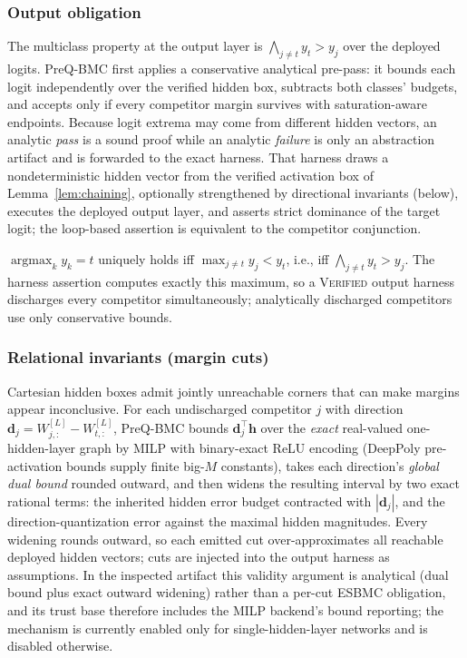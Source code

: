 \subsubsection{Output obligation}
The multiclass property at the output layer is
$\bigwedge_{j\ne t} y_t > y_j$ over the deployed logits. PreQ-BMC first
applies a conservative analytical pre-pass: it bounds each logit
independently over the verified hidden box, subtracts both classes'
budgets, and accepts only if every competitor margin survives with
saturation-aware endpoints. Because logit extrema may come from
different hidden vectors, an analytic \emph{pass} is a sound proof
while an analytic \emph{failure} is only an abstraction artifact and is
forwarded to the exact harness. That harness draws a nondeterministic
hidden vector from the verified activation box of
Lemma~\ref{lem:chaining}, optionally strengthened by directional
invariants (below), executes the deployed output layer, and asserts
strict dominance of the target logit; the loop-based assertion is
equivalent to the competitor conjunction.
 
\begin{lemma}
\label{lem:output}
$\operatorname{argmax}_k y_k = t$ uniquely holds iff
$\max_{j\ne t} y_j < y_t$, i.e., iff $\bigwedge_{j\ne t} y_t > y_j$.
The harness assertion computes exactly this maximum, so a
\textsc{Verified} output harness discharges every competitor
simultaneously; analytically discharged competitors use only
conservative bounds.
\end{lemma}
 
\subsubsection{Relational invariants (margin cuts)}
Cartesian hidden boxes admit jointly unreachable corners that can make
margins appear inconclusive. For each undischarged competitor $j$ with
direction $\mathbf{d}_j = W^{[L]}_{j,:} - W^{[L]}_{t,:}$, PreQ-BMC
bounds $\mathbf{d}_j^{\!\top}\mathbf{h}$ over the \emph{exact}
real-valued one-hidden-layer graph by MILP with binary-exact ReLU
encoding (DeepPoly pre-activation bounds supply finite big-$M$
constants), takes each direction's \emph{global dual bound} rounded
outward, and then widens the resulting interval by two exact rational
terms: the inherited hidden error budget contracted with
$|\mathbf{d}_j|$, and the direction-quantization error against the
maximal hidden magnitudes. Every widening rounds outward, so each
emitted cut over-approximates all reachable deployed hidden vectors;
cuts are injected into the output harness as assumptions. In the
inspected artifact this validity argument is analytical
(dual bound plus exact outward widening) rather than a per-cut ESBMC
obligation, and its trust base therefore includes the MILP backend's
bound reporting; the mechanism is currently enabled only for
single-hidden-layer networks and is disabled otherwise.
 
